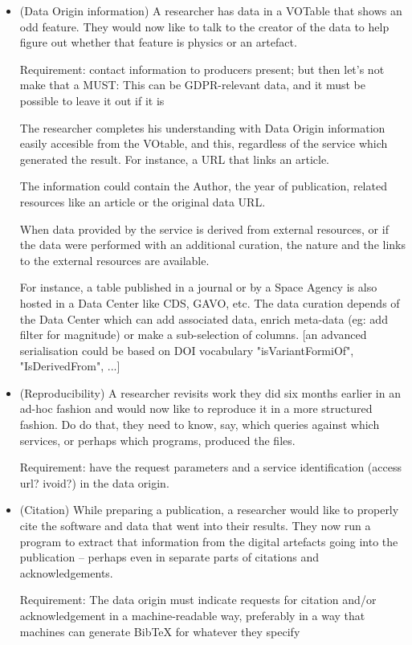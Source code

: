 \documentclass[11pt,a4paper]{ivoa}
\begin{document}
\begin{itemize}
	\item (Data Origin information) A researcher has data in a VOTable that shows an odd feature. They would now like to talk to the creator of the data to help figure out whether that feature is physics or an artefact. 
	
	Requirement: contact information to producers present; but then let's not make that a MUST: This can be GDPR-relevant data, and it must be possible to leave it out if it is
	
	The researcher completes his understanding with Data Origin information easily accesible from the VOtable, and this, regardless of the service which generated the result. For instance, a URL that links an article. 
	
	The information could contain the Author, the year of publication, related resources like an article or the original data URL.
	
	When data provided by the service is derived from external resources, or if the data were performed with an additional curation, the nature and the links to the external resources are available.
	
	For instance, a table published in a journal or by a Space Agency is also hosted in a Data Center like CDS, GAVO, etc. The data curation depends of the Data Center which can add associated data, enrich meta-data (eg: add filter for magnitude) or make a sub-selection of columns. [an advanced serialisation could be based on DOI vocabulary "isVariantFormiOf", "IsDerivedFrom", ...]
	
	\item (Reproducibility) A researcher revisits work they did six months earlier in an ad-hoc fashion and would now like to reproduce it in a more structured fashion. Do do that, they need to know, say, which queries against which services, or perhaps which programs, produced the files. 
	
	Requirement: have the request parameters and a service identification (access url? ivoid?) in the data origin.
	
	\item (Citation) While preparing a publication, a researcher would like to properly cite the software and data that went into their results. They now run a program to extract that information from the digital artefacts going into the publication -- perhaps even in separate parts of citations and acknowledgements. 
	
	Requirement: The data origin must indicate requests for citation and/or acknowledgement in a machine-readable way, preferably in a way that machines can generate BibTeX for whatever they specify
	

\end{itemize}
\end{document}
